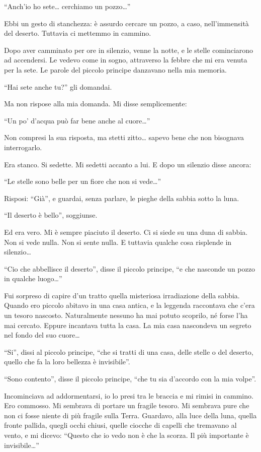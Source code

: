 \documentclass[11pt]{scrbook}
\begin{document}
``Anch'io ho sete\ldots{} cerchiamo un pozzo\ldots{}''

Ebbi un gesto di stanchezza: è assurdo cercare un pozzo, a caso, nell'immensità del deserto. Tuttavia ci mettemmo in cammino.

Dopo aver camminato per ore in silenzio, venne la notte, e le stelle cominciarono ad accendersi. Le vedevo come in sogno, attraverso la febbre che mi era venuta per la sete. Le parole del piccolo principe danzavano nella mia memoria.

``Hai sete anche tu?'' gli domandai.

Ma non rispose alla mia domanda. Mi disse semplicemente:

``Un po' d'acqua può far bene anche al cuore\ldots{}''

Non compresi la sua risposta, ma stetti zitto\ldots{} sapevo bene che non bisognava interrogarlo.

Era stanco. Si sedette. Mi sedetti accanto a lui. E dopo un silenzio disse ancora:

``Le stelle sono belle per un fiore che non si vede\ldots{}''

Risposi: ``Già'', e guardai, senza parlare, le pieghe della sabbia sotto la luna.

``Il deserto è bello'', soggiunse.

Ed era vero. Mi è sempre piaciuto il deserto. Ci si siede su una duna di sabbia. Non si vede nulla. Non si sente nulla. E tuttavia qualche cosa risplende in silenzio\ldots{}

``Cio che abbellisce il deserto'', disse il piccolo principe, ``e che nasconde un pozzo in qualche luogo\ldots{}''

Fui sorpreso di capire d'un tratto quella misteriosa irradiazione della sabbia. Quando ero piccolo abitavo in una casa antica, e la leggenda raccontava che c'era un tesoro nascosto. Naturalmente nessuno ha mai potuto scoprilo, né forse l'ha mai cercato. Eppure incantava tutta la casa. La mia casa nascondeva un segreto nel fondo del suo cuore\ldots{}

``Si'', dissi al piccolo principe, ``che si tratti di una casa, delle stelle o del deserto, quello che fa la loro bellezza è invisibile''.

``Sono contento'', disse il piccolo principe, ``che tu sia d'accordo con la mia volpe''.

Incominciava ad addormentarsi, io lo presi tra le braccia e mi rimisi in cammino. Ero commosso. Mi sembrava di portare un fragile tesoro. Mi sembrava pure che non ci fosse niente di più fragile sulla Terra. Guardavo, alla luce della luna, quella fronte pallida, quegli occhi chiusi, quelle ciocche di capelli che tremavano al vento, e mi dicevo: ``Questo che io vedo non è che la scorza. Il più importante è invisibile\ldots{}''
\end{document}
